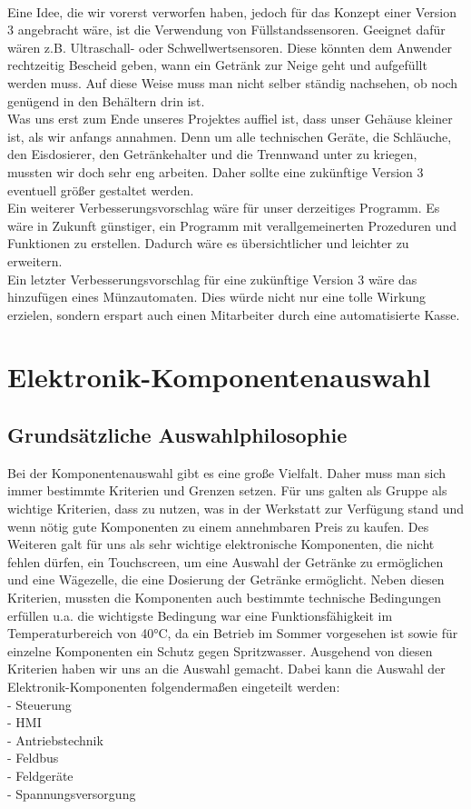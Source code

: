 \documentclass[10pt,a4paper]{report}
\begin{document}
	\\
	Eine Idee, die wir vorerst verworfen haben, jedoch für das Konzept einer Version 3 angebracht wäre, ist die Verwendung von Füllstandssensoren. Geeignet dafür wären z.B. Ultraschall- oder Schwellwertsensoren. Diese könnten dem Anwender rechtzeitig Bescheid geben, wann ein Getränk zur Neige geht und aufgefüllt werden muss. Auf diese Weise muss man nicht selber ständig nachsehen, ob noch genügend in den Behältern drin ist.
	\\
	Was uns erst zum Ende unseres Projektes auffiel ist, dass unser Gehäuse kleiner ist, als wir anfangs annahmen. Denn um alle technischen Geräte, die Schläuche, den Eisdosierer, den Getränkehalter und die Trennwand unter zu kriegen, mussten wir doch sehr eng arbeiten. Daher sollte eine zukünftige Version 3 eventuell größer gestaltet werden.
	\\
	Ein weiterer Verbesserungsvorschlag wäre für unser derzeitiges Programm. Es wäre in Zukunft günstiger, ein Programm mit verallgemeinerten Prozeduren und Funktionen zu erstellen. Dadurch wäre es übersichtlicher und leichter zu erweitern.
	\\
	Ein letzter Verbesserungsvorschlag für eine zukünftige Version 3 wäre das hinzufügen eines Münzautomaten. Dies würde nicht nur eine tolle Wirkung erzielen, sondern erspart auch einen Mitarbeiter durch eine automatisierte Kasse.
	\chapter{Elektronik-Komponentenauswahl}
	
	\section{Grundsätzliche Auswahlphilosophie}
	Bei der Komponentenauswahl gibt es eine große Vielfalt. Daher muss man sich immer bestimmte Kriterien und Grenzen setzen. Für uns galten als Gruppe als wichtige Kriterien, dass zu nutzen, was in der Werkstatt zur Verfügung stand und wenn nötig gute Komponenten zu einem annehmbaren Preis zu kaufen. 	
	Des Weiteren galt für uns als sehr wichtige elektronische Komponenten, die nicht fehlen dürfen, ein Touchscreen, um eine Auswahl der Getränke zu ermöglichen und eine Wägezelle, die eine Dosierung der Getränke ermöglicht.
	Neben diesen Kriterien, mussten die Komponenten auch bestimmte technische Bedingungen erfüllen u.a. die wichtigste Bedingung war eine Funktionsfähigkeit im Temperaturbereich von 40°C, da ein Betrieb im Sommer vorgesehen ist sowie für einzelne Komponenten ein Schutz gegen Spritzwasser.
	Ausgehend von diesen Kriterien haben wir uns an die Auswahl gemacht. 
	Dabei kann die Auswahl der Elektronik-Komponenten folgendermaßen eingeteilt werden:\\
	- Steuerung\\
	- HMI\\
	- Antriebstechnik\\
	- Feldbus\\
	- Feldgeräte\\
	- Spannungsversorgung\\
	
\end{document}
